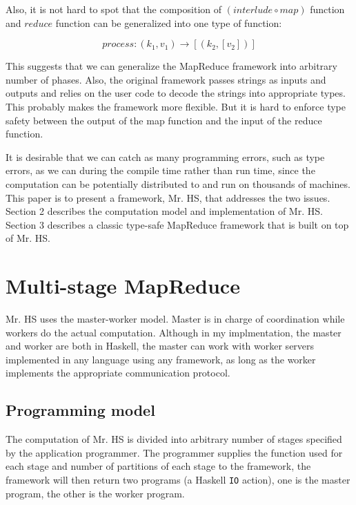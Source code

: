 \documentclass[a4paper]{article}
\begin{document}
Also, it is not hard to spot that the composition of $(interlude \circ map)$ function 
and $reduce$ function
can be generalized into one type of function:

\[
process : (k_1, v_1) \rightarrow [(k_2, [v_2])]
\]

This suggests that we can generalize the MapReduce framework into arbitrary number
of phases.
\newline \newline
Also, the original framework passes strings as inputs and outputs and relies
on the user code to decode the strings into appropriate types.
This probably makes the framework more flexible.
But it is hard to enforce type safety between the output of 
the map function and the input of the reduce function. 

It is desirable that we can catch as many programming errors, such as type errors, as
we can during the compile time rather than run time,
since the computation 
can be potentially distributed to and run on thousands of machines.
\newline\newline
This paper is to present a framework, Mr. HS, that addresses the two issues.
Section 2 describes the computation model and implementation
of Mr. HS. Section 3 describes a classic type-safe MapReduce framework 
that is built on top of Mr. HS.


\section{Multi-stage MapReduce}
Mr. HS uses the master-worker model.
Master is in charge of coordination while workers
do the actual computation.
Although in my implmentation, the master and worker are both 
in Haskell, the master can work with worker
servers implemented in any language using any framework, 
as long as the worker implements the appropriate 
communication protocol.

\subsection{Programming model}
The computation of Mr. HS is divided into arbitrary number 
of stages specified by the application programmer.
The programmer supplies the function used for 
each stage and number of partitions of each 
stage to the framework,
the framework will then return two  
programs (a Haskell \texttt{IO} action),
one is the master program, the other is the worker program. 
\end{document}
